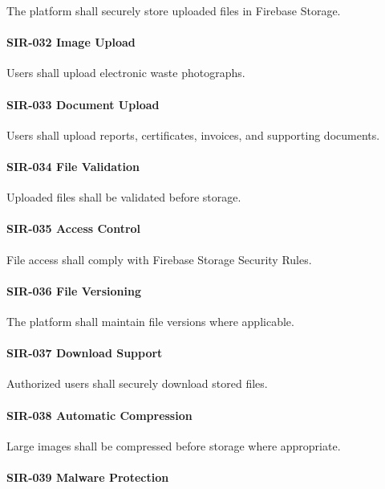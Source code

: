 The platform shall securely store uploaded files in Firebase Storage.

\paragraph{SIR-032 Image Upload}

Users shall upload electronic waste photographs.

\paragraph{SIR-033 Document Upload}

Users shall upload reports, certificates, invoices, and supporting
documents.

\paragraph{SIR-034 File Validation}

Uploaded files shall be validated before storage.

\paragraph{SIR-035 Access Control}

File access shall comply with Firebase Storage Security Rules.

\paragraph{SIR-036 File Versioning}

The platform shall maintain file versions where applicable.

\paragraph{SIR-037 Download Support}

Authorized users shall securely download stored files.

\paragraph{SIR-038 Automatic Compression}

Large images shall be compressed before storage where appropriate.

\paragraph{SIR-039 Malware Protection}


